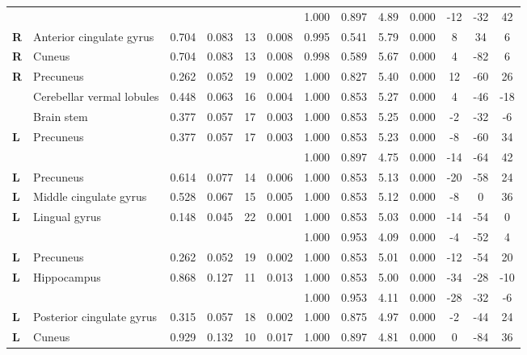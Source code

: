 \begin{landscape}
\begin{table}[!ht]
\begin{tabular}{ll|cccc|cccc|ccc}
        \textbf{} & & & & & & 1.000 & 0.897  & 4.89 & 0.000 & -12 & -32 & 42 \\
        \textbf{R} & Anterior cingulate gyrus & 0.704 & 0.083 & 13 & 0.008 & 0.995 & 0.541 & 5.79 & 0.000 & 8 & 34 & 6 \\
        \textbf{R} & Cuneus & 0.704 & 0.083 & 13 & 0.008 & 0.998 & 0.589 & 5.67 & 0.000 & 4 & -82 & 6 \\
        \textbf{R} & Precuneus & 0.262 & 0.052 & 19 & 0.002 & 1.000 & 0.827 & 5.40 & 0.000 & 12 & -60 & 26 \\
        \textbf{} & Cerebellar vermal lobules & 0.448 & 0.063 & 16 & 0.004 & 1.000 & 0.853 & 5.27 & 0.000 & 4 & -46 & -18 \\
        \textbf{} & Brain stem & 0.377 & 0.057 & 17 & 0.003 & 1.000 & 0.853 & 5.25 & 0.000 & -2 & -32 & -6 \\
        \textbf{L} & Precuneus & 0.377 & 0.057 & 17 & 0.003 & 1.000 & 0.853 & 5.23 & 0.000 & -8 & -60 & 34 \\
        \textbf{} & & & & & & 1.000 & 0.897 & 4.75 & 0.000 & -14 & -64 & 42 \\
        \textbf{L} & Precuneus & 0.614 & 0.077 & 14 & 0.006 & 1.000 & 0.853 & 5.13 & 0.000 & -20 & -58 & 24 \\
        \textbf{L} & Middle cingulate gyrus & 0.528 & 0.067 & 15 & 0.005 & 1.000 & 0.853 & 5.12 & 0.000 & -8 & 0 & 36 \\
        \textbf{L} & Lingual gyrus & 0.148 & 0.045 & 22 & 0.001 & 1.000 & 0.853 & 5.03 & 0.000 & -14 & -54 & 0 \\
        \textbf{} & & & & & & 1.000 & 0.953 & 4.09 & 0.000 & -4 & -52 & 4 \\
        \textbf{L} & Precuneus & 0.262 & 0.052 & 19 & 0.002 & 1.000 & 0.853 & 5.01 & 0.000 & -12 & -54 & 20 \\
        \textbf{L} & Hippocampus & 0.868 & 0.127 & 11 & 0.013 & 1.000 & 0.853 & 5.00 & 0.000 & -34 & -28 & -10 \\
        \textbf{} & & & & & & 1.000 & 0.953 & 4.11 & 0.000 & -28 & -32 & -6 \\
        \textbf{L} & Posterior cingulate gyrus & 0.315 & 0.057 & 18 & 0.002 & 1.000 & 0.875 & 4.97 & 0.000 & -2 & -44 & 24 \\
        \textbf{L} & Cuneus & 0.929 & 0.132 & 10 & 0.017 & 1.000 & 0.897 & 4.81 & 0.000 & 0 & -84 & 36 \\

\end{tabular}
\end{table}
\end{landscape}
